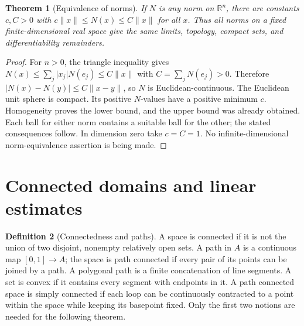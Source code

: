 \documentclass[11pt,oneside,openany]{book}
\newtheorem{theorem}{Theorem}[chapter]
\theoremstyle{definition}
\newtheorem{definition}[theorem]{Definition}
\theoremstyle{remark}
\newcommand{\R}{\mathbb R}
\newcommand{\abs}[1]{\lvert#1\rvert}
\newcommand{\norm}[1]{\lVert#1\rVert}
\newcommand{\family}[1]{}
\begin{document}
\begin{theorem}[Equivalence of norms]\label{d04:01:norm-equivalence}
If $N$ is any norm on $\R^n$, there are constants $c,C>0$ with
$c\norm{x}\leq N(x)\leq C\norm{x}$ for all $x$. Thus all norms on
a fixed finite-dimensional real space give the same limits, topology,
compact sets, and differentiability remainders.
\end{theorem}
\begin{proof}
For $n>0$, the triangle inequality gives
$N(x)\leq\sum_j\abs{x_j}N(e_j)\leq C\norm{x}$ with
$C=\sum_jN(e_j)>0$. Therefore
$\abs{N(x)-N(y)}\leq C\norm{x-y}$, so $N$ is Euclidean-continuous.
The Euclidean unit sphere is compact. Its positive $N$-values have a positive
minimum $c$. Homogeneity proves the lower bound, and the upper bound was
already obtained. Each ball for either norm contains a suitable ball for the
other; the stated consequences follow. In dimension zero take $c=C=1$.
No infinite-dimensional norm-equivalence assertion is being made.
\end{proof}

\section{Connected domains and linear estimates}
\family{K04.01.08}\family{K04.01.09}

\begin{definition}[Connectedness and paths]\label{d04:01:connected-definition}
A space is connected if it is not the union of two disjoint, nonempty
relatively open sets. A path in $A$ is a continuous map $[0,1]\to A$;
the space is path connected if every pair of its points can be joined by a
path. A polygonal path is a finite concatenation of line segments. A set is
convex if it contains every segment with endpoints in it. A path connected
space is simply connected if each loop can be continuously contracted to a
point within the space while keeping its basepoint fixed. Only the first
two notions are needed for the following theorem.
\end{definition}
\end{document}
